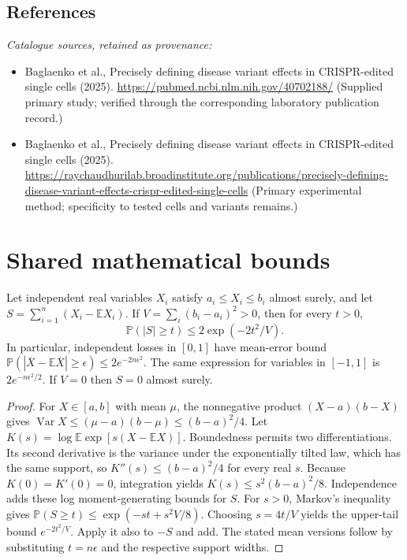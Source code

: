 \documentclass[11pt]{article}
\begin{document}
\subsection{References}
\noindent\emph{Catalogue sources, retained as provenance:}
\begin{itemize}
\item Baglaenko et al., Precisely defining disease variant effects in CRISPR-edited single cells (2025). \url{https://pubmed.ncbi.nlm.nih.gov/40702188/} (Supplied primary study; verified through the corresponding laboratory publication record.)
\item Baglaenko et al., Precisely defining disease variant effects in CRISPR-edited single cells (2025). \url{https://raychaudhurilab.broadinstitute.org/publications/precisely-defining-disease-variant-effects-crispr-edited-single-cells} (Primary experimental method; specificity to tested cells and variants remains.)
\end{itemize}




\section{Shared mathematical bounds}\label{app:bounds}
\begin{lemma}\label{lem:bounded}
Let independent real variables $X_i$ satisfy $a_i\leq X_i\leq b_i$ almost surely,
and let $S=\sum_{i=1}^n(X_i-\mathbb{E} X_i)$. If
$V=\sum_i(b_i-a_i)^2>0$, then for every $t>0$,
\[
 \mathbb{P}(|S|\geq t)\leq 2\exp(-2t^2/V).
\]
In particular, independent losses in $[0,1]$ have mean-error bound
$\mathbb{P}(|\overline X-\mathbb{E}\overline X|\geq\epsilon)
\leq2e^{-2n\epsilon^2}$. The same expression for variables in $[-1,1]$
is $2e^{-n\epsilon^2/2}$. If $V=0$ then $S=0$ almost surely.
\end{lemma}
\begin{proof}
For $X\in[a,b]$ with mean $\mu$, the nonnegative product
$(X-a)(b-X)$ gives
$\operatorname{Var} X\leq(\mu-a)(b-\mu)\leq(b-a)^2/4$.
Let $K(s)=\log\mathbb{E}\exp[s(X-\mathbb{E} X)]$.
Boundedness permits two differentiations. Its second derivative is the variance
under the exponentially tilted law, which has the same support, so
$K''(s)\leq(b-a)^2/4$ for every real $s$.
Because $K(0)=K'(0)=0$, integration yields
$K(s)\leq s^2(b-a)^2/8$.
Independence adds these log moment-generating bounds for $S$.
For $s>0$, Markov's inequality gives
$\mathbb{P}(S\geq t)\leq\exp(-st+s^2V/8)$.
Choosing $s=4t/V$ yields the upper-tail bound $e^{-2t^2/V}$.
Apply it also to $-S$ and add. The stated mean versions follow by substituting
$t=n\epsilon$ and the respective support widths.
\end{proof}
\end{document}
